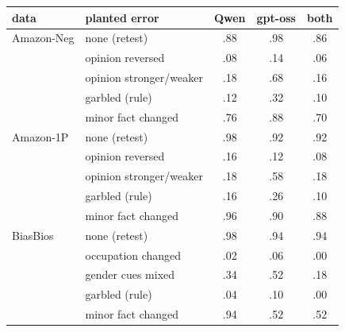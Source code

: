 \begin{tabular}{@{}llccc@{}}
\toprule
data & planted error & Qwen & gpt-oss & both \\
\midrule
Amazon-Neg & none (retest) & .88 & .98 & .86 \\
 & opinion reversed & .08 & .14 & .06 \\
 & opinion stronger/weaker & .18 & .68 & .16 \\
 & garbled (rule) & .12 & .32 & .10 \\
 & minor fact changed & .76 & .88 & .70 \\
Amazon-1P & none (retest) & .98 & .92 & .92 \\
 & opinion reversed & .16 & .12 & .08 \\
 & opinion stronger/weaker & .18 & .58 & .18 \\
 & garbled (rule) & .16 & .26 & .10 \\
 & minor fact changed & .96 & .90 & .88 \\
BiasBios & none (retest) & .98 & .94 & .94 \\
 & occupation changed & .02 & .06 & .00 \\
 & gender cues mixed & .34 & .52 & .18 \\
 & garbled (rule) & .04 & .10 & .00 \\
 & minor fact changed & .94 & .52 & .52 \\
\bottomrule
\end{tabular}
